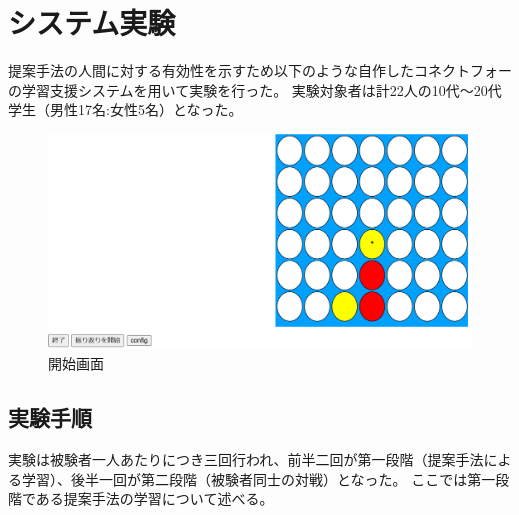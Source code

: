 \section{システム実験}
提案手法の人間に対する有効性を示すため以下のような自作したコネクトフォーの学習支援システムを用いて実験を行った。
実験対象者は計22人の10代～20代学生（男性17名:女性5名）となった。
\begin{figure}[t]
	\centering
	\includegraphics[width=\linewidth]{./figure/basicSystem.png}
	\caption{開始画面}
	\label{fig:basic}
\end{figure}
\subsection{実験手順}
実験は被験者一人あたりにつき三回行われ、前半二回が第一段階（提案手法による学習）、後半一回が第二段階（被験者同士の対戦）となった。
ここでは第一段階である提案手法の学習について述べる。
